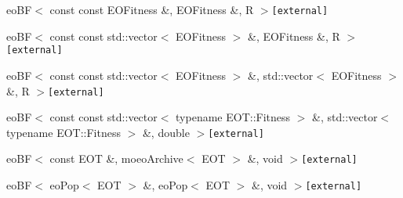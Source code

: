 \begin{CompactList}
\begin{CompactList}
\begin{CompactList}
\begin{CompactList}
\begin{CompactList}
\end{CompactList}
\end{CompactList}
\end{CompactList}
\item eo\-BF$<$ const const EOFitness \&, EOFitness \&, R $>${\tt  [external]}\begin{CompactList}
\item {}
\end{CompactList}
\item eo\-BF$<$ const const std::vector$<$ EOFitness $>$ \&, EOFitness \&, R $>${\tt  [external]}\begin{CompactList}
\item {}
\end{CompactList}
\item eo\-BF$<$ const const std::vector$<$ EOFitness $>$ \&, std::vector$<$ EOFitness $>$ \&, R $>${\tt  [external]}\begin{CompactList}
\item {}
\end{CompactList}
\item eo\-BF$<$ const const std::vector$<$ typename EOT::Fitness $>$ \&, std::vector$<$ typename EOT::Fitness $>$ \&, double $>${\tt  [external]}\begin{CompactList}
\item {}
\end{CompactList}
\item eo\-BF$<$ const EOT \&, moeo\-Archive$<$ EOT $>$ \&, void $>${\tt  [external]}\begin{CompactList}
\item {}
\begin{CompactList}
\item {}
\end{CompactList}
\end{CompactList}
\item eo\-BF$<$ eo\-Pop$<$ EOT $>$ \&, eo\-Pop$<$ EOT $>$ \&, void $>${\tt  [external]}\begin{CompactList}

\end{CompactList}
\end{CompactList}
\end{CompactList}
